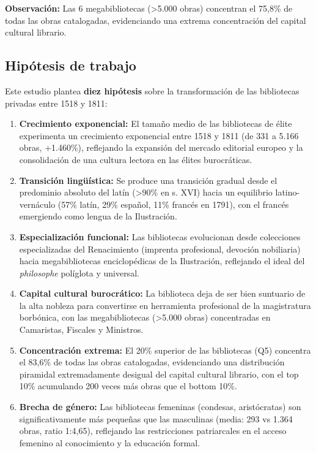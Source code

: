 \documentclass[12pt,a4paper]{article}
\begin{document}
\textbf{Observación:} Las 6 megabibliotecas (>5.000 obras) concentran el 75,8\% de todas las obras catalogadas, evidenciando una extrema concentración del capital cultural librario.

\subsection{Hipótesis de trabajo}

Este estudio plantea \textbf{diez hipótesis} sobre la transformación de las bibliotecas privadas entre 1518 y 1811:

\begin{enumerate}[label=\textbf{H\arabic*:}]
\item \textbf{Crecimiento exponencial:} El tamaño medio de las bibliotecas de élite experimenta un crecimiento exponencial entre 1518 y 1811 (de 331 a 5.166 obras, +1.460\%), reflejando la expansión del mercado editorial europeo y la consolidación de una cultura lectora en las élites burocráticas.

\item \textbf{Transición lingüística:} Se produce una transición gradual desde el predominio absoluto del latín (>90\% en s. XVI) hacia un equilibrio latino-vernáculo (57\% latín, 29\% español, 11\% francés en 1791), con el francés emergiendo como lengua de la Ilustración.

\item \textbf{Especialización funcional:} Las bibliotecas evolucionan desde colecciones especializadas del Renacimiento (imprenta profesional, devoción nobiliaria) hacia megabibliotecas enciclopédicas de la Ilustración, reflejando el ideal del \textit{philosophe} políglota y universal.

\item \textbf{Capital cultural burocrático:} La biblioteca deja de ser bien suntuario de la alta nobleza para convertirse en herramienta profesional de la magistratura borbónica, con las megabibliotecas (>5.000 obras) concentradas en Camaristas, Fiscales y Ministros.

\item \textbf{Concentración extrema:} El 20\% superior de las bibliotecas (Q5) concentra el 83,6\% de todas las obras catalogadas, evidenciando una distribución piramidal extremadamente desigual del capital cultural librario, con el top 10\% acumulando 200 veces más obras que el bottom 10\%.

\item \textbf{Brecha de género:} Las bibliotecas femeninas (condesas, aristócratas) son significativamente más pequeñas que las masculinas (media: 293 vs 1.364 obras, ratio 1:4,65), reflejando las restricciones patriarcales en el acceso femenino al conocimiento y la educación formal.


\end{enumerate}
\end{document}
